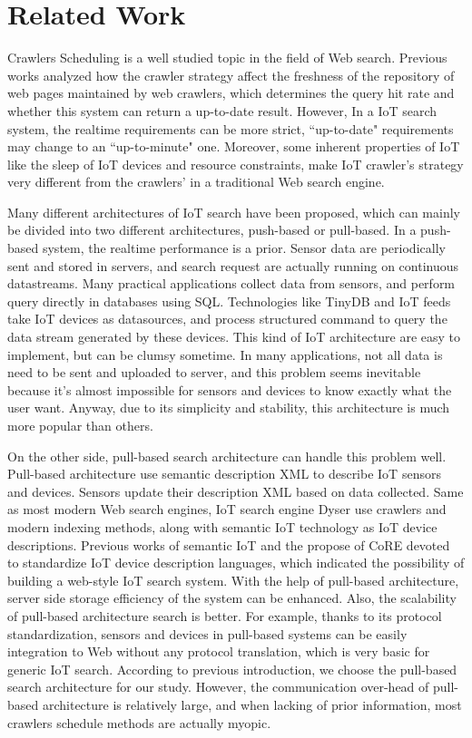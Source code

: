 \documentclass[conference]{IEEEtran}
\begin{document}
\section{Related Work}

Crawlers Scheduling is a well studied topic in the field of Web search. Previous works\cite{Cho2000}\cite{Wolf2002}\cite{Challenger2004} analyzed how the crawler strategy affect the freshness of the repository of web pages maintained by web crawlers, which determines the query hit rate and whether this system can return a up-to-date result. However, In a IoT search system, the realtime requirements can be more strict, ``up-to-date" requirements may change to an ``up-to-minute" one. Moreover, some inherent properties of IoT like the sleep of IoT devices and resource constraints, make IoT crawler's strategy very different from the crawlers' in a traditional Web search engine. 


Many different architectures of IoT search have been proposed, which can mainly be divided into two different architectures, push-based or pull-based.
In a push-based system, the realtime performance is a prior. Sensor data are periodically sent and stored in servers, and search request are actually running on continuous datastreams. Many practical applications collect data from sensors, and perform query directly in databases using SQL. Technologies like TinyDB\cite{TinyDB} and IoT feeds\cite{Whitehouse2006} take IoT devices as datasources, and process structured command to query the data stream generated by these devices. This kind of IoT architecture are easy to implement, but can be clumsy sometime. In many applications, not all data is need to be sent and uploaded to server, and this problem seems inevitable because it's almost impossible for sensors and devices to know exactly what the user want. Anyway, due to its simplicity and stability, this architecture is much more popular than others.


On the other side, pull-based search architecture can handle this problem well. Pull-based architecture use semantic description XML to describe IoT sensors and devices. Sensors update their description XML based on data collected. Same as most modern Web search engines, IoT search engine Dyser\cite{Dyser} use crawlers and modern indexing methods, along with semantic IoT technology as IoT device descriptions. Previous works of semantic IoT\cite{Compton2012} and the propose of CoRE\cite{CoREWorkingGroup2012} devoted to standardize IoT device description languages, which indicated the possibility of building a web-style IoT search system. 
With the help of pull-based architecture, server side storage efficiency of the system can be enhanced. Also, the scalability of pull-based architecture search is better. For example, thanks to its protocol standardization, sensors and devices in pull-based systems can be easily integration to Web without any protocol translation, which is very basic for generic IoT search. According to previous introduction, we choose the pull-based search architecture for our study. However, the communication over-head of pull-based architecture is relatively large, and when lacking of prior information, most crawlers schedule methods are actually myopic.
\end{document}
